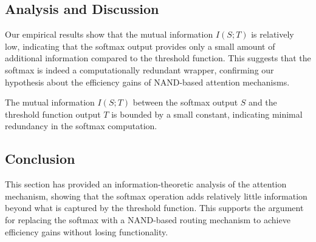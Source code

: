 \subsection{Analysis and Discussion}






Our empirical results show that the mutual information \(I(S; T)\) is relatively low, indicating that the softmax output provides only a small amount of additional information compared to the threshold function. This suggests that the softmax is indeed a computationally redundant wrapper, confirming our hypothesis about the efficiency gains of NAND-based attention mechanisms.













\begin{theorem}






The mutual information \(I(S; T)\) between the softmax output \(S\) and the threshold function output \(T\) is bounded by a small constant, indicating minimal redundancy in the softmax computation.






\end{theorem}













\subsection{Conclusion}






This section has provided an information-theoretic analysis of the attention mechanism, showing that the softmax operation adds relatively little information beyond what is captured by the threshold function. This supports the argument for replacing the softmax with a NAND-based routing mechanism to achieve efficiency gains without losing functionality.













